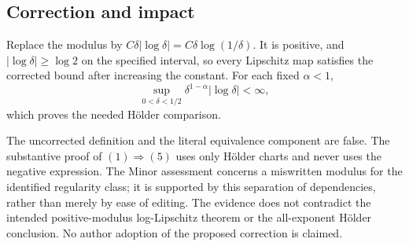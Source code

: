 \documentclass[10pt]{article}
\begin{document}
\subsection*{Correction and impact}
Replace the modulus by \(C\delta|\log\delta|=C\delta\log(1/\delta)\). It is positive, and \(|\log\delta|\geq\log2\) on the specified interval, so every Lipschitz map satisfies the corrected bound after increasing the constant. For each fixed \(\alpha<1\), \[\sup_{0<\delta<1/2}\delta^{1-\alpha}|\log\delta|<\infty ,\] which proves the needed Hölder comparison.\par
The uncorrected definition and the literal equivalence component are false. The substantive proof of \((1)\Rightarrow(5)\) uses only Hölder charts and never uses the negative expression. The Minor assessment concerns a miswritten modulus for the identified regularity class; it is supported by this separation of dependencies, rather than merely by ease of editing. The evidence does not contradict the intended positive-modulus log-Lipschitz theorem or the all-exponent Hölder conclusion. No author adoption of the proposed correction is claimed.\par
\end{document}
